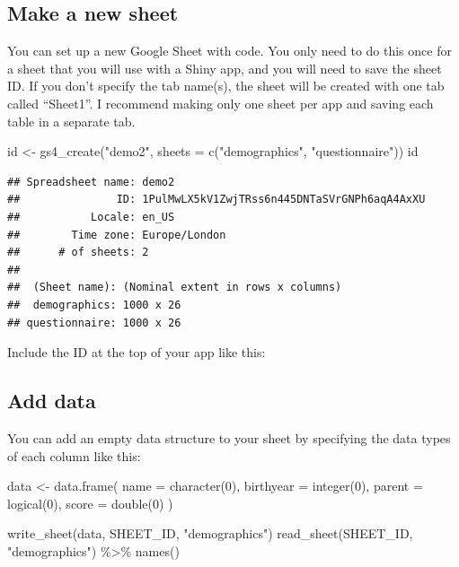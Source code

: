 \documentclass[
]{book}
\newenvironment{Shaded}{\begin{snugshade}}{\end{snugshade}}
\newcommand{\AttributeTok}[1]{\textcolor[rgb]{0.77,0.63,0.00}{#1}}
\newcommand{\DecValTok}[1]{\textcolor[rgb]{0.00,0.00,0.81}{#1}}
\newcommand{\FunctionTok}[1]{\textcolor[rgb]{0.00,0.00,0.00}{#1}}
\newcommand{\NormalTok}[1]{#1}
\newcommand{\OtherTok}[1]{\textcolor[rgb]{0.56,0.35,0.01}{#1}}
\newcommand{\SpecialCharTok}[1]{\textcolor[rgb]{0.00,0.00,0.00}{#1}}
\newcommand{\StringTok}[1]{\textcolor[rgb]{0.31,0.60,0.02}{#1}}
\begin{document}
\hypertarget{make-a-new-sheet}{%
\subsection{Make a new sheet}\label{make-a-new-sheet}}

You can set up a new Google Sheet with code. You only need to do this once for a sheet that you will use with a Shiny app, and you will need to save the sheet ID. If you don't specify the tab name(s), the sheet will be created with one tab called ``Sheet1''. I recommend making only one sheet per app and saving each table in a separate tab.

\begin{Shaded}
\begin{Highlighting}[]
\NormalTok{id }\OtherTok{\textless{}{-}} \FunctionTok{gs4\_create}\NormalTok{(}\StringTok{"demo2"}\NormalTok{, }\AttributeTok{sheets =} \FunctionTok{c}\NormalTok{(}\StringTok{"demographics"}\NormalTok{, }\StringTok{"questionnaire"}\NormalTok{))}
\NormalTok{id}
\end{Highlighting}
\end{Shaded}

\begin{verbatim}
## Spreadsheet name: demo2
##               ID: 1PulMwLX5kV1ZwjTRss6n445DNTaSVrGNPh6aqA4AxXU
##           Locale: en_US
##        Time zone: Europe/London
##      # of sheets: 2
## 
##  (Sheet name): (Nominal extent in rows x columns)
##  demographics: 1000 x 26
## questionnaire: 1000 x 26
\end{verbatim}

Include the ID at the top of your app like this:

\hypertarget{add-data}{%
\subsection{Add data}\label{add-data}}

You can add an empty data structure to your sheet by specifying the data types of each column like this:

\begin{Shaded}
\begin{Highlighting}[]
\NormalTok{data }\OtherTok{\textless{}{-}} \FunctionTok{data.frame}\NormalTok{(}
  \AttributeTok{name =} \FunctionTok{character}\NormalTok{(}\DecValTok{0}\NormalTok{),}
  \AttributeTok{birthyear =} \FunctionTok{integer}\NormalTok{(}\DecValTok{0}\NormalTok{),}
  \AttributeTok{parent =} \FunctionTok{logical}\NormalTok{(}\DecValTok{0}\NormalTok{),}
  \AttributeTok{score =} \FunctionTok{double}\NormalTok{(}\DecValTok{0}\NormalTok{)}
\NormalTok{)}

\FunctionTok{write\_sheet}\NormalTok{(data, SHEET\_ID, }\StringTok{"demographics"}\NormalTok{)}
\FunctionTok{read\_sheet}\NormalTok{(SHEET\_ID, }\StringTok{"demographics"}\NormalTok{) }\SpecialCharTok{\%\textgreater{}\%} \FunctionTok{names}\NormalTok{()}
\end{Highlighting}
\end{Shaded}
\end{document}
